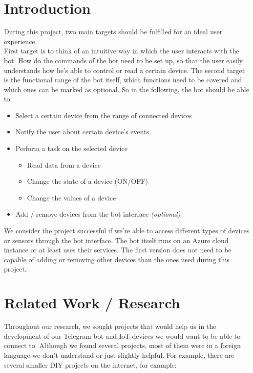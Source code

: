 \documentclass[a4paper]{article}
\begin{document}
	\section{Introduction}
	
	During this project, two main targets should be fulfilled for an ideal user experience.\\
	First target is to think of an intuitive way in which the user interacts with the bot. 
	How do the commands of the bot need to be set up, so that the user easily understands how he's able to control or read a certain device. 
	The second target is the functional range of the bot itself, which functions need to be covered and which ones can be marked as optional. 
	So in the following, the bot should be able to:
	\vspace{1em}
	\begin{itemize}
		\item Select a certain device from the range of connected devices
		\item Notify the user about certain device's events
		\item Perform a task on the selected device
			\begin{itemize}
				\item Read data from a device
				\item Change the state of a device (ON/OFF)
				\item Change the values of a device
			\end{itemize}
		\item Add / remove devices from the bot interface \textit{(optional)}
	\end{itemize}
\vspace{1em}
	We consider the project successful if we're able to access different types of devices or sensors through the bot interface. 
	The bot itself runs on an Azure cloud instance or at least uses their services. 
	The first version does not need to be capable of adding or removing other devices than the ones used during this project.
	
	\section{Related Work / Research}
	
	Throughout our research, we sought projects that would help us in the development of our Telegram bot and IoT devices we would want to be able to connect to. 
	Although we found several projects, most of them were in a foreign language we don't understand or just slightly helpful. 
	For example, there are several smaller DIY projects on the internet, for example:
	
\end{document}
